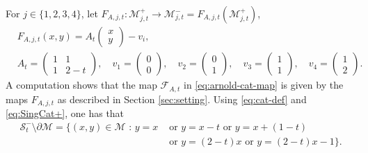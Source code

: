 \documentclass{amsart}
\numberwithin{equation}{section}
\newcommand\cF{{\mathcal F}}
\newcommand\cM{{\mathcal M}}
\newcommand\cS{{\mathcal S}}
\newcommand{\catt}{\cF_{A,t}}
\newcommand{\catjt}{F_{A,j,t}}
\begin{document}
For \(j \in \{1,2,3,4\}\), let \(\catjt: \cM_{j,t}^{+} \to \cM_{j,t}^- = \catjt \left(\cM_{j,t}^+\right)\),
\begin{equation}\label{eq:cat-def}
\begin{split}
  &\catjt (x,y) = A_t\begin{pmatrix}
    x\\
    y
  \end{pmatrix} - v_i,\\
  & A_t = \begin{pmatrix}1&1\\ 1& 2-t\end{pmatrix}, \quad v_1 = \begin{pmatrix}
    0\\
    0
  \end{pmatrix}, \quad v_2 = \begin{pmatrix}
    0\\
    1
  \end{pmatrix}, \quad v_3 = \begin{pmatrix}
    1\\
    1
  \end{pmatrix}, \quad v_4 = \begin{pmatrix}
    1\\
    2
  \end{pmatrix}.
\end{split}  
\end{equation}
 A computation shows that the map \(\catt\) in \eqref{eq:arnold-cat-map} is given by the maps \(F_{A,j,t}\) as described in Section \ref{sec:setting}. Using \eqref{eq:cat-def} and \eqref{eq:SingCat+}, one has that
\begin{equation}
  \label{eq:singCat-}
  \begin{split}
  \cS_t^{-} \setminus \partial \cM = \bigl\{(x,y) \in \cM \text{ : } y = x &\text{ or }y = x - t  \text{ or }y = x + (1-t) \\
&\text{ or }y = (2-t)x \text{ or }y = (2-t)x - 1\bigr\}.
  \end{split}
\end{equation}
\end{document}
